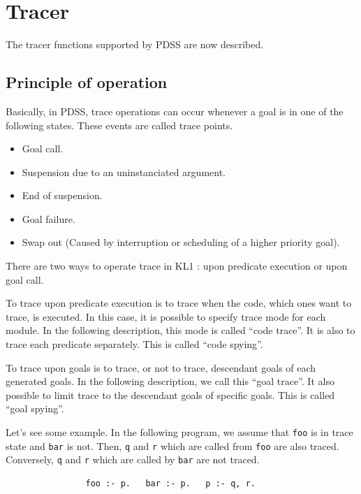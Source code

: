\newpage
\section{Tracer}
\label{sec-tracer}

The tracer functions supported by PDSS are now described.

\subsection{Principle of operation}

Basically, in PDSS, trace operations can occur whenever a goal is in one of the
following states. These events are called trace points.
\begin{itemize}
\item Goal call.
\item Suspension due to an uninstanciated argument.
\item End of suspension.
\item Goal failure.
\item Swap out (Caused by interruption or scheduling of a higher priority
goal).
\end{itemize}

There are two ways to operate trace in KL1 : upon predicate execution or
upon goal call.

To trace upon predicate execution is to trace when the code, which ones
want to trace, is executed. In this case, it is possible to specify trace mode
for each module. In the following description, this mode is called
``code trace''.
It is also to trace each predicate separately.
This is called ``code spying''.

To trace upon goals is to trace, or not to trace, descendant goals of each
generated goals. In the following description, we call this ``goal trace''.
It also possible to limit trace to the descendant goals of specific goals.
This is called ``goal spying''.

Let's see some example. In the following program, we assume that \verb|foo|
is in trace state and \verb|bar| is not. Then, \verb|q| and \verb|r|
which are called from \verb|foo| are also traced. Conversely, \verb|q|
and \verb|r| which are called by \verb|bar| are not traced.
\begin{verbatim}
                foo :- p.   bar :- p.   p :- q, r.
\end{verbatim}

